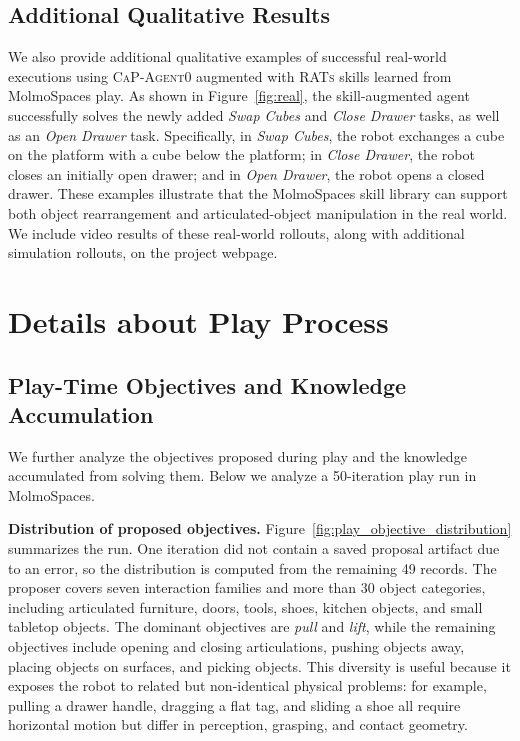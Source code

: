 \documentclass{llmxive}
\begin{document}
\subsection{Additional Qualitative Results}
\label{sec:appendix_additional_qualitative}

We also provide additional qualitative examples of successful real-world executions using
\textsc{CaP-Agent0} augmented with \textsc{RATs} skills learned from MolmoSpaces play. As shown
in Figure~\ref{fig:real}, the skill-augmented agent successfully solves
the newly added \textit{Swap Cubes} and \textit{Close Drawer} tasks, as well as an \textit{Open Drawer}
task. Specifically, in \textit{Swap Cubes}, the robot exchanges a cube on the platform with a cube 
below the platform; in \textit{Close Drawer}, the robot closes an initially open drawer; and in 
\textit{Open Drawer}, the robot opens a closed drawer. These examples illustrate that the MolmoSpaces 
skill library can support both object rearrangement and articulated-object manipulation in the real world. 
We include video results of these real-world rollouts, along with additional simulation rollouts, 
on the project webpage.





\section{Details about Play Process}
\label{sec:appendix_play_process}

\subsection{Play-Time Objectives and Knowledge Accumulation}
\label{sec:appendix_play_accumulation}

We further analyze the objectives proposed during play and the
knowledge accumulated from solving them. Below we analyze a 50-iteration play
run in MolmoSpaces.

\textbf{Distribution of proposed objectives.}
Figure~\ref{fig:play_objective_distribution} summarizes the run.
One iteration did not contain a saved proposal artifact due to an error, so the distribution
is computed from the remaining 49 records. The proposer covers seven
interaction families and more than 30 object categories, including articulated
furniture, doors, tools, shoes, kitchen objects, and small tabletop objects.
The dominant objectives are \emph{pull} and \emph{lift}, while the remaining
objectives include opening and closing articulations, pushing objects away,
placing objects on surfaces, and picking objects. This diversity is useful
because it exposes the robot to related but non-identical physical problems:
for example, pulling a drawer handle, dragging a flat tag, and sliding a shoe
all require horizontal motion but differ in perception, grasping, and contact
geometry.
\end{document}
